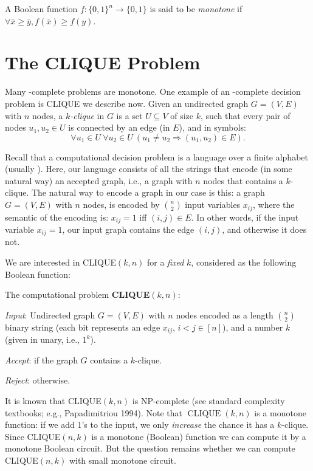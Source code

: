 \begin{definition}
A Boolean function $f:\{0,1\}^n \rightarrow\{0,1\}$ is said to be  \emph{monotone} if $\forall \bar{x} \geq \bar{y}, f(\bar{x}) \geq f(y)$.
\end{definition}

\section{The CLIQUE Problem}
Many \NP-complete problems are monotone. One example of an \NP-complete decision problem is  CLIQUE we describe now. 
Given an undirected graph $G=(V, E)$ with $n$ nodes, a \emph{$k$-clique} in $G$ is a set $U\subseteq V$ of size $k$, such that  every pair of nodes $u_1, u_2 \in U$ is connected by an edge (in $E$), and in symbols:
$$
 \forall u_1 \in U~\forall u_2 \in U~ ( u_1 \neq u_2\Rightarrow (u_1, u_2)\in E).
$$


Recall that a computational decision problem is a language over a finite alphabet (usually \bits). Here, our language consists of all the strings that encode (in some natural way) an accepted graph, i.e., a graph with $n$ nodes that contains a $k$-clique.
The natural way to encode a graph in our case is this: a graph  $G=(V, E) $ with $n$ nodes, is encoded by $\binom{n}{2}$ input variables  $x_{ij}$, where the semantic of the encoding is: $x_{i j}=1$ iff $(i, j) \in E$. In other words, if the input variable $x_{ij}=1$,   our input graph contains the edge $(i,j)$, and otherwise it does not. 

We are interested in CLIQUE$(k, n)$ for a \emph{fixed} $k$, considered as the following Boolean function: 
\begin{svgraybox}
The computational problem \textbf{CLIQUE$(k, n)$}: 

\textit{Input}: Undirected graph $G=(V,E)$ with $n$ nodes encoded as a length $n\choose 2$ binary string (each bit represents an  edge  $x_{ij}$, $i<j\in[n]$), and a number $k$ (given in unary, i.e., $1^k$).

\textit{Accept}: if the graph $G$ contains a $k$-clique. 

\textit{Reject}: otherwise.
\end{svgraybox}


 
 
It is known that CLIQUE$(k,n)$ is NP-complete (see standard complexity textbooks; e.g., Papadimitriou 1994).
Note that $\operatorname{CLIQUE}(k, n)$ is a monotone function: if we add 1's to the input, we only \emph{increase} the chance it has a $k$-clique. Since CLIQUE$(n, k)$ is a monotone (Boolean)
function we can compute it by a monotone Boolean circuit. But the question remains whether we can compute CLIQUE$(n, k)$ with small monotone circuit. 


